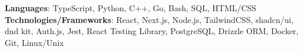 \textbf{Languages}: TypeScript, Python, C++, Go, Bash, SQL, HTML/CSS \\
\textbf{Technologies/Frameworks}: React, Next.js, Node.js, TailwindCSS, shadcn/ui, dnd kit, Auth.js, Jest, React Testing Library, PostgreSQL, Drizzle ORM, Docker, Git, Linux/Unix
